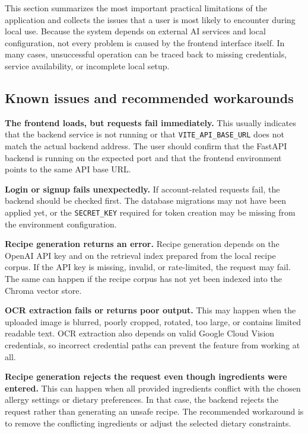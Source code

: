 This section summarizes the most important practical limitations of
the application and collects the issues that a user is most likely to
encounter during local use. Because the system depends on external AI
services and local configuration, not every problem is caused by
the frontend interface itself. In many cases, unsuccessful operation
can be traced back to missing credentials, service availability,
or incomplete local setup.

\subsection{Known issues and recommended workarounds}

\textbf{The frontend loads, but requests fail immediately.}
This usually indicates that the backend service is not running or that
\texttt{VITE\_API\_BASE\_URL} does not match the actual backend
address. The user should confirm that the FastAPI backend is running
on the expected port and that the frontend environment points to the
same API base URL.

\textbf{Login or signup fails unexpectedly.}
If account-related requests fail, the backend should be checked first.
The database migrations may not have been applied yet, or the
\texttt{SECRET\_KEY} required for token creation may be missing from
the environment configuration.

\textbf{Recipe generation returns an error.}
Recipe generation depends on the OpenAI API key and on the retrieval
index prepared from the local recipe corpus. If the API key is
missing, invalid, or rate-limited, the request may fail. The same can
happen if the recipe corpus has not yet been indexed into the Chroma
vector store.

\textbf{OCR extraction fails or returns poor output.}
This may happen when the uploaded image is blurred, poorly cropped,
rotated, too large, or contains limited readable text. OCR extraction
also depends on valid Google Cloud Vision credentials, so incorrect
credential paths can prevent the feature from working at all.

\textbf{Recipe generation rejects the request even though ingredients
were entered.}
This can happen when all provided ingredients conflict with the chosen
allergy settings or dietary preferences. In that case, the backend
rejects the request rather than generating an unsafe recipe. The
recommended workaround is to remove the conflicting ingredients or
adjust the selected dietary constraints.

